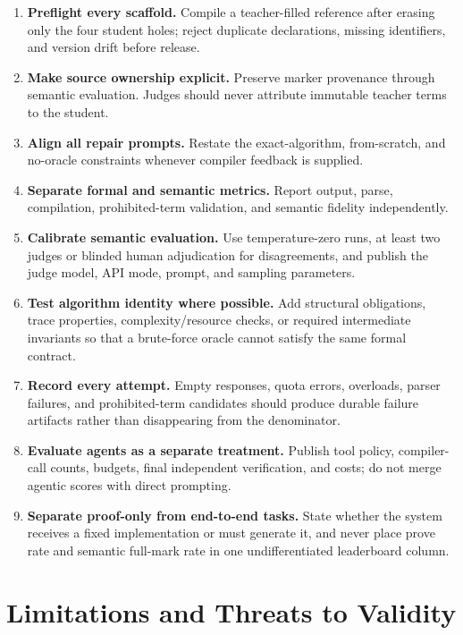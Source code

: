 \documentclass{article}
\begin{document}
\begin{enumerate}[leftmargin=*,itemsep=4pt]
  \item \textbf{Preflight every scaffold.}  Compile a teacher-filled reference after
        erasing only the four student holes; reject duplicate declarations, missing
        identifiers, and version drift before release.
  \item \textbf{Make source ownership explicit.}  Preserve marker provenance through
        semantic evaluation.  Judges should never attribute immutable teacher terms to
        the student.
  \item \textbf{Align all repair prompts.}  Restate the exact-algorithm, from-scratch,
        and no-oracle constraints whenever compiler feedback is supplied.
  \item \textbf{Separate formal and semantic metrics.}  Report output, parse,
        compilation, prohibited-term validation, and semantic fidelity independently.
  \item \textbf{Calibrate semantic evaluation.}  Use temperature-zero runs, at least
        two judges or blinded human adjudication for disagreements, and publish the
        judge model, API mode, prompt, and sampling parameters.
  \item \textbf{Test algorithm identity where possible.}  Add structural obligations,
        trace properties, complexity/resource checks, or required intermediate
        invariants so that a brute-force oracle cannot satisfy the same formal contract.
  \item \textbf{Record every attempt.}  Empty responses, quota errors, overloads,
        parser failures, and prohibited-term candidates should produce durable failure
        artifacts rather than disappearing from the denominator.
  \item \textbf{Evaluate agents as a separate treatment.}  Publish tool policy,
        compiler-call counts, budgets, final independent verification, and costs; do
        not merge agentic scores with direct prompting.
  \item \textbf{Separate proof-only from end-to-end tasks.}  State whether the system
        receives a fixed implementation or must generate it, and never place prove rate
        and semantic full-mark rate in one undifferentiated leaderboard column.
\end{enumerate}

\section{Limitations and Threats to Validity}
\end{document}
